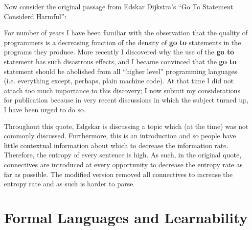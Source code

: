 \documentclass[10pt,\jkfside,a4paper]{article}
\begin{document}
\begin{enumerate}
Now consider the original passage from Edskar Dijkstra's ``Go To Statement
Considerd Harmful'':
\begin{center}
\begin{minipage}{0.6\textwidth}
For  number of years I have been familiar with the observation that the
quality of programmers is a decreasing function of the density of
\textbf{go to} statements in the programs they produce. More recently I
discovered why the use of the \textbf{go to} statement has such disastrous
effects, and I became convinced that the \textbf{go to} statement should be
abolished from all ``higher level'' programming languages (i.e. everything
except, perhaps, plain machine code). At that time I did not attach too much
importance to this discovery; I now submit my considerations for publication
because in very recent discussions in which the subject turned up, I have
been urged to do so.
\end{minipage}
\end{center}

Throughout this quote, Edgskar is discussing a topic which (at the time) was
not commonly discussed. Furthermore, this is an introduction and so people
have little contextual information about which to decrease the information
rate. Therefore, the entropy of every sentence is high. As such, in the
original quote, connectives are introduced at every opportunity to decrease
the entropy rate as far as possible. The modified version removed all
connectives to increase the entropy rate and as such is harder to parse.

\end{enumerate}

\section{Formal Languages and Learnability}
\end{document}
